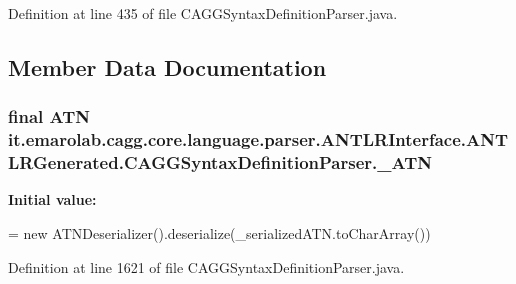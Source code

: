 Definition at line 435 of file C\-A\-G\-G\-Syntax\-Definition\-Parser.\-java.



\subsection{Member Data Documentation}
\hypertarget{classit_1_1emarolab_1_1cagg_1_1core_1_1language_1_1parser_1_1ANTLRInterface_1_1ANTLRGenerated_1_1CAGGSyntaxDefinitionParser_a279f5cba6427e06c55aecf23e7717377}{
\subsubsection[{\-\_\-\-A\-T\-N}]{\setlength{\rightskip}{0pt plus 5cm}final A\-T\-N it.\-emarolab.\-cagg.\-core.\-language.\-parser.\-A\-N\-T\-L\-R\-Interface.\-A\-N\-T\-L\-R\-Generated.\-C\-A\-G\-G\-Syntax\-Definition\-Parser.\-\_\-\-A\-T\-N\hspace{0.3cm}{\ttfamily [static]}}}\label{classit_1_1emarolab_1_1cagg_1_1core_1_1language_1_1parser_1_1ANTLRInterface_1_1ANTLRGenerated_1_1CAGGSyntaxDefinitionParser_a279f5cba6427e06c55aecf23e7717377}
{\bfseries Initial value\-:}
\begin{DoxyCode}
=
        \textcolor{keyword}{new} ATNDeserializer().deserialize(\_serializedATN.toCharArray())
\end{DoxyCode}


Definition at line 1621 of file C\-A\-G\-G\-Syntax\-Definition\-Parser.\-java.

